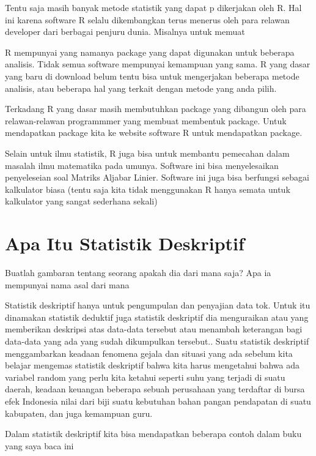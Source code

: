 \documentclass[
]{book}
\theoremstyle{definition}
\theoremstyle{definition}
\theoremstyle{definition}
\theoremstyle{definition}
\theoremstyle{remark}
\begin{document}
Tentu saja masih banyak metode statistik yang dapat p dikerjakan oleh R. Hal ini karena software R selalu dikembangkan terus menerus oleh para relawan developer dari berbagai penjuru dunia. Misalnya untuk memuat

R mempunyai yang namanya package yang dapat digunakan untuk beberapa analisis. Tidak semua software mempunyai kemampuan yang sama. R yang dasar yang baru di download belum tentu bisa untuk mengerjakan beberapa metode analisis, atau beberapa hal yang terkait dengan metode yang anda pilih.

Terkadang R yang dasar masih membutuhkan package yang dibangun oleh para relawan-relawan programmmer yang membuat membentuk package. Untuk mendapatkan package kita ke website software R untuk mendapatkan package.

Selain untuk ilmu statistik, R juga bisa untuk membantu pemecahan dalam masalah ilmu matematika pada umunya. Software ini bisa menyelesaikan penyeleseian soal Matriks Aljabar Linier. Software ini juga bisa berfungsi sebagai kalkulator biasa (tentu saja kita tidak menggunakan R hanya semata untuk kalkulator yang sangat sederhana sekali)

\hypertarget{apa-itu-statistik-deskriptif}{%
\chapter{Apa Itu Statistik Deskriptif}\label{apa-itu-statistik-deskriptif}}

Buatlah gambaran tentang seorang apakah dia dari mana saja? Apa ia mempunyai nama asal dari mana

Statistik deskriptif hanya untuk pengumpulan dan penyajian data tok. Untuk itu dinamakan statistik deduktif juga statistik deskriptif dia menguraikan atau yang memberikan deskripsi atas data-data tersebut atau menambah keterangan bagi data-data yang ada yang sudah dikumpulkan tersebut..
Suatu statistik deskriptif menggambarkan keadaan fenomena gejala dan situasi yang ada sebelum kita belajar mengemas statistik deskriptif bahwa kita harus mengetahui bahwa ada variabel random yang perlu kita ketahui seperti suhu yang terjadi di suatu daerah, keadaan keuangan beberapa sebuah perusahaan yang terdaftar di bursa efek Indonesia nilai dari biji suatu kebutuhan bahan pangan pendapatan di suatu kabupaten, dan juga kemampuan guru.

Dalam statistik deskriptif kita bisa mendapatkan beberapa contoh dalam buku yang saya baca ini
\end{document}
